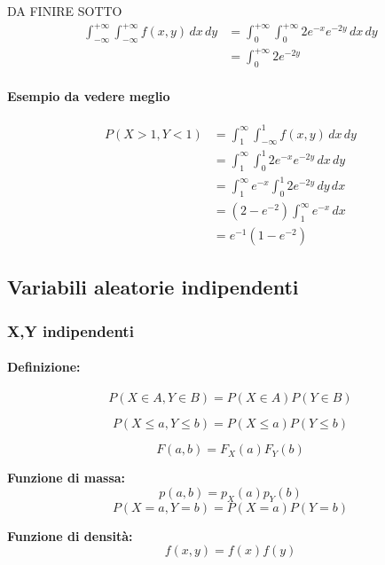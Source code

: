 \documentclass[]{article}
\newcommand{\definizione}{\paragraph{Definizione:}}
\begin{document}
    DA FINIRE SOTTO
    \begin{equation*}
        \begin{split}
            \int_{-\infty}^{+\infty}\int_{-\infty}^{+\infty} f(x,y) \, dx \, dy & = \int_{0}^{+\infty}\int_{0}^{+\infty} 2e^{-x}e^{-2y} \, dx \, dy \\
            & = \int_{0}^{+\infty} 2 e^{-2y}
        \end{split}
    \end{equation*}

    \paragraph{Esempio da vedere meglio}
    \begin{equation*}
        \begin{split}
            P(X > 1, Y < 1) & = \int_{1}^{\infty} \int_{-\infty}^{1} f(x,y) \, dx \, dy \\
            & = \int_{1}^{\infty} \int_{0}^{1} 2e^{-x} e^{-2y} \, dx \, dy \\
            & = \int_{1}^{\infty} e^{-x} \int_{0}^{1} 2e^{-2y} \, dy \, dx \\
            & = (2 - e^{-2}) \int_{1}^{\infty} e^{-x} \, dx \\
            & = e^{-1}(1 - e^{-2})
        \end{split}
    \end{equation*}

    \subsection{Variabili aleatorie indipendenti}
    \subsubsection{X,Y indipendenti}
    \definizione
    \[ P(X \in A, Y \in B) = P(X \in A) P(Y \in B)\]

    \[ P(X \leq a, Y \leq b) = P(X \leq a) P(Y \leq b)\]

    \[ F(a,b) = F_X(a) F_Y(b)\]

    \textbf{Funzione di massa:}
    \[ p(a,b) = p_X(a) p_Y(b) \]
    \[ P(X=a, Y=b) = P(X=a) P(Y=b)\]

    \textbf{Funzione di densità:}
    \[ f(x, y) = f(x) f(y)\]
    
\end{document}
